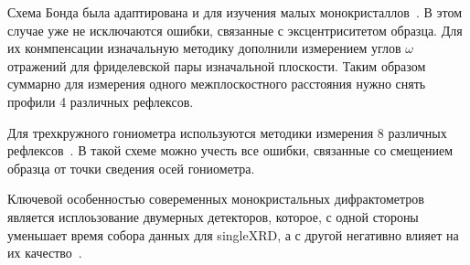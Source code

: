 \documentclass[a4paper, 12pt]{article}
\begin{document}
Схема Бонда была адаптирована и для изучения малых монокристаллов~\cite{Hubbard:1976,Ponomarev:1969}.
В этом случае уже не исключаются ошибки, связанные с эксцентриситетом образца.
Для их конмпенсации изначальную методику дополнили измерением углов $\omega$ отражений для фриделевской пары изначальной плоскости.
Таким образом суммарно для измерения одного межплоскостного расстояния нужно снять профили 4 различных рефлексов.

Для трехкружного гониометра используются методики измерения 8 различных рефлексов~\cite{King:1979}.
В такой схеме можно учесть все ошибки, связанные со смещением образца от точки сведения осей гониометра.

Ключевой особенностью совеременных монокристальных дифрактометров является исплоьзование двумерных детекторов, которое, с одной стороны уменьшает время собора данных для \gls{singleXRD}, а с другой негативно влияет на их качество~\cite{Dudka:2017}.



\end{document}
